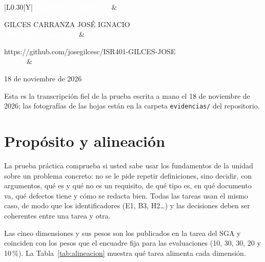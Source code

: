 \documentclass[11pt]{article}
\newcommand{\bhdr}[1]{\cellcolor{midblue}\textcolor{white}{\textbf{#1}}}
\newcommand{\seccion}[1]{\section{\textcolor{utegreendk}{#1}}}
\begin{document}
	\vspace{6pt}
	\noindent\begin{tabularx}{\linewidth}{|L{0.30\linewidth}|Y|}
		\hline
		\bhdr{Apellidos y nombres} & \rule{0pt}{14pt}GILCES CARRANZA JOSÉ IGNACIO\\
		\hline
		\bhdr{URL del repositorio} & \rule{0pt}{14pt}https://github.com/josegilcesc/ISR401-GILCES-JOSE\\
		\hline
		\bhdr{Fecha} & \rule{0pt}{14pt}18 de noviembre de 2026\\
		\hline
	\end{tabularx}
	
	\vspace{6pt}
	\begin{cajaclave}[title={Declaración de transcripción fiel (Regla R5)}]
		Esta es la transcripción fiel de la prueba escrita a mano el 18 de noviembre de 2026; las fotografías de las hojas están en la carpeta \texttt{evidencias/} del repositorio.
	\end{cajaclave}
	
	\seccion{Propósito y alineación}
	
	La prueba práctica comprueba si usted sabe usar los fundamentos de la unidad sobre un problema concreto: no se le pide repetir definiciones, sino decidir, con argumentos, qué es y qué no es un requisito, de qué tipo es, en qué documento va, qué defectos tiene y cómo se redacta bien. Todas las tareas usan el mismo caso, de modo que los identificadores (E1, B3, H2\ldots) y las decisiones deben ser coherentes entre una tarea y otra.
	
	Las cinco dimensiones y sus pesos son los publicados en la tarea del SGA y coinciden con los pesos que el encuadre fija para las evaluaciones (10, 30, 30, 20 y 10\,\%). La Tabla~\ref{tab:alineacion} muestra qué tarea alimenta cada dimensión.
	
\end{document}
